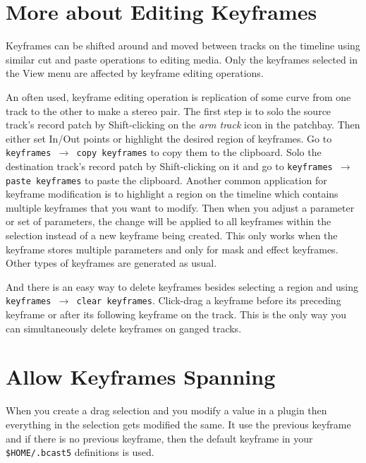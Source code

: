 \section{More about Editing Keyframes}%
\label{sec:more_about_editing_keyframes}

Keyframes can be shifted around and moved between tracks on the timeline using similar cut and paste operations to editing media.  Only the keyframes selected in the View menu are affected by keyframe editing operations.

An often used, keyframe editing operation is replication of some curve from one track to the other to make a stereo pair.  The first step is to solo the source track's record patch by Shift-clicking on the \textit{arm track} icon in the patchbay.  Then either set In/Out points or highlight the desired region of keyframes.  Go to \texttt{keyframes $\rightarrow$ copy keyframes} to copy them to the clipboard.  Solo the destination track's record patch by Shift-clicking on it and go to \texttt{keyframes $\rightarrow$ paste keyframes} to paste the clipboard.  Another common application for keyframe modification is to highlight a region on the timeline which contains multiple keyframes that you want to modify.  Then when you adjust a parameter or set of parameters, the change will be applied to all keyframes within the selection instead of a new keyframe being created.  This only works when the keyframe stores multiple parameters and only for mask and effect keyframes.  Other types of keyframes are generated as usual.

And there is an easy way to delete keyframes besides selecting a region and using \texttt{keyframes $\rightarrow$ clear keyframes}. Click-drag a keyframe before its preceding keyframe or after its following keyframe on the track.  This is the only way you can simultaneously delete keyframes on ganged tracks.

\section{Allow Keyframes Spanning}%
\label{sec:allow_keyframes_spanning}

When you create a drag selection and you modify a value in a plugin then everything in the selection gets modified the same.  It use the previous keyframe and if there is no previous keyframe, then the default keyframe in your \texttt{\$HOME/.bcast5} definitions is used.



